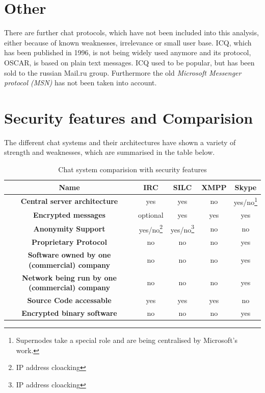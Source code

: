 \section{Other}
There are further chat protocols, which have not been included into this
analysis, either because of known weaknesses, irrelevance or small user base.
ICQ, which has been published in 1996, is not being widely used anymore
and its protocol, OSCAR\cite{oscar}, is based on plain text messages.
ICQ used to be popular, but has been sold to the russian Mail.ru group.
Furthermore the old \textit{Microsoft Messenger protocol (MSN)} has not
been taken into account.
\section{Security features and Comparision}
The different chat systems and their architectures have shown a variety
of strength and weaknesses, which are summarised in the table below.
\begin{longtable}{|c|c|c|c|c|}
\caption{Chat system comparision with security features}\\
\hline
\textbf{Name} & \textbf{IRC} & \textbf{SILC} & \textbf{XMPP} & \textbf{Skype}\\
\hline
\textbf{Central server architecture} & yes & yes & no & yes/no\footnote{Supernodes take a special role and are
being centralised by Microsoft's work.}\\
\hline
\textbf{Encrypted messages} & optional & yes & yes & yes\\
\hline
\textbf{Anonymity Support} & yes/no\footnote{IP address cloacking}  & yes/no\footnote{IP address cloacking} & no & no\\
\hline
\textbf{Proprietary Protocol} & no  & no & no & yes\\
\hline
\textbf{Software owned by one (commercial) company} & no  & no & no & yes\\
\hline
\textbf{Network being run by one (commercial) company} & no  & no & no & yes\\
\hline
\textbf{Source Code accessable} & yes  & yes & yes & no\\
\hline
\textbf{Encrypted binary software} & no  & no & no & yes\\
\hline
\end{longtable}
